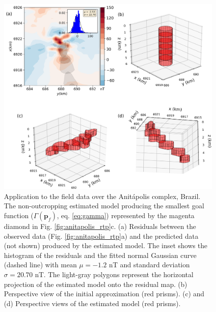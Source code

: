 \begin{figure}
	\centering
	\includegraphics[width=\linewidth]{figures/real_results_magenta_diamond.png}
	\caption{Application to the field data over the Anit{\'a}polis complex, Brazil.
	The non-outcropping estimated model producing the smallest goal function 
	($ \Gamma(\mathbf{p}_f)$, eq. \ref{eq:gamma})	represented by the magenta diamond 
	in Fig. \ref{fig:anitapolis_rtp}c.
	(a) Residuals between the observed data (Fig. \ref{fig:anitapolis_rtp}a) and the 
	predicted data (not shown) produced by the estimated model. 
	The inset shows the histogram of the residuals and the fitted normal 
	Gaussian curve (dashed line) with mean $\mu = -1.2$ nT and 
	standard deviation $\sigma = 20.70$ nT.
	The light-gray polygons represent the horizontal projection of the estimated 
	model onto the residual map. 
	(b) Perspective view of the initial approximation (red prisms). 
	(c) and (d) Perspective views of the estimated model (red prisms).}
	\label{fig:real_result2}
\end{figure}

